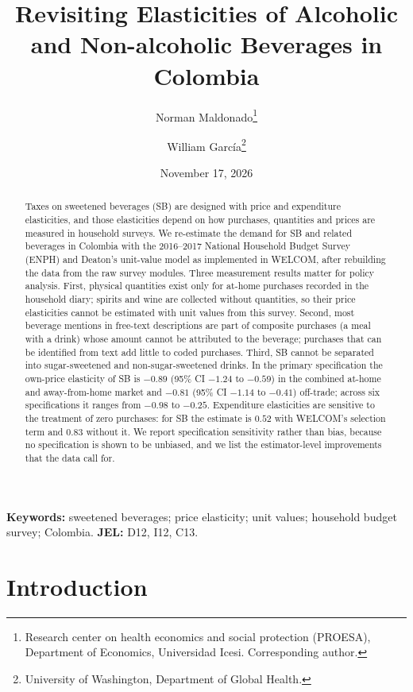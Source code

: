 \documentclass[
  11pt,
]{article}
\title{Revisiting Elasticities of Alcoholic and Non-alcoholic Beverages
in Colombia}
\author{Norman Maldonado\footnote{Research center on health economics
  and social protection (PROESA), Department of Economics, Universidad
  Icesi. Corresponding author.} \and William García\footnote{University
  of Washington, Department of Global Health.}}
\date{November 17, 2026}
\begin{document}
\maketitle

\begin{abstract}
\noindent Taxes on sweetened beverages (SB) are designed with price and expenditure elasticities, and those elasticities depend on how purchases, quantities and prices are measured in household surveys. We re-estimate the demand for SB and related beverages in Colombia with the 2016--2017 National Household Budget Survey (ENPH) and Deaton's unit-value model as implemented in WELCOM, after rebuilding the data from the raw survey modules. Three measurement results matter for policy analysis. First, physical quantities exist only for at-home purchases recorded in the household diary; spirits and wine are collected without quantities, so their price elasticities cannot be estimated with unit values from this survey. Second, most beverage mentions in free-text descriptions are part of composite purchases (a meal with a drink) whose amount cannot be attributed to the beverage; purchases that can be identified from text add little to coded purchases. Third, SB cannot be separated into sugar-sweetened and non-sugar-sweetened drinks. In the primary specification the own-price elasticity of SB is $-0.89$ (95\% CI $-1.24$ to $-0.59$) in the combined at-home and away-from-home market and $-0.81$ (95\% CI $-1.14$ to $-0.41$) off-trade; across six specifications it ranges from $-0.98$ to $-0.25$. Expenditure elasticities are sensitive to the treatment of zero purchases: for SB the estimate is $0.52$ with WELCOM's selection term and $0.83$ without it. We report specification sensitivity rather than bias, because no specification is shown to be unbiased, and we list the estimator-level improvements that the data call for.
\end{abstract}

\noindent\textbf{Keywords:} sweetened beverages; price elasticity; unit
values; household budget survey; Colombia. \quad \textbf{JEL:} D12, I12,
C13.

\section{Introduction}\label{introduction}
\end{document}
